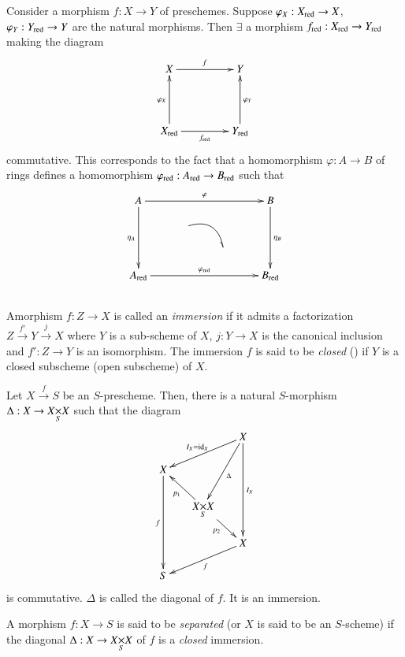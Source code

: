 Consider a morphism $f:X\to Y$ of preschemes. Suppose
$\varphi_{X}:X_{\operatorname{red}}\to X$, $\varphi_{Y}:Y_{\operatorname{red}}\to Y$ are the
natural morphisms. Then $\exists$ a morphism $f_{\operatorname{red}}:X_{\operatorname{red}}\to
Y_{\operatorname{red}}$ making the diagram
\[
\xymatrix@=1.5cm{
X\ar[r]^{f} & Y\\
X_{\red}\ar[u]^{\varphi_{X}}\ar[r]_{f_{\red}} & Y_{\red}\ar[u]_{\varphi_{Y}}
}
\]
commutative. This corresponds to the fact that a homomorphism
$\varphi:A\to B$ of rings defines a homomorphism
$\varphi_{\operatorname{red}}:A_{\operatorname{red}}\to B_{\operatorname{red}}$ such that
\[
\xymatrix@R=.5cm@C=1cm{
A\ar[rrr]^{\varphi}\ar[ddd]_{\eta_{A}} & & & B\ar[ddd]^{\eta_{B}}\\
 & \ar@/^1pc/@{-_{>}}[dr] & & \\
 & & & \\
A_{\red}\ar[rrr]^{\varphi_{\red}} & & & B_{\red}
}
\]


\subsection{}\label{chap2-sec2.4.2}%

A\pageoriginale morphism $f:Z\to X$ is called an {\em immersion} if it admits a factorization $Z\xrightarrow{f'}Y\xrightarrow{j}X$ where $Y$ is a sub-scheme of $X$, $j:Y\to X$ is the canonical inclusion and $f':Z\to Y$ is an isomorphism. The immersion $f$ is said to be {\em closed} () if $Y$ is a closed subscheme (\resp open subscheme) of $X$.

\begin{example*}
Let $X\xrightarrow{f}S$ be an $S$-prescheme. Then, there is a natural $S$-morphism $\Delta:X\to \fprod{X}{X}{S}$ such that the diagram
\[
\xymatrix@=.6cm{
 & & X\ar[dll]_{I_{X}=\id_{X}}\ar[ddd]^{I_{X}}\ar[ddl]^{\Delta}\\
X\ar[ddd]_{f} & & \\
 & \fprod{X}{X}{S}\ar[ul]^{p_{1}}\ar[dr]_{p_{2}} & \\
 & & X\ar[lld]^{f}\\
S & &
}
\]
is commutative. $\Delta$ is called the diagonal of $f$. It is an immersion.
\end{example*}

\setcounter{subsubsection}{2}
\begin{subdefin}\label{chap2-defi2.4.2.1}%
A morphism $f:X\to S$ is said to be {\em separated} (or $X$ is said to be an $S$-scheme) if the diagonal $\Delta:X\to \fprod{X}{X}{S}$ of $f$ is a {\em closed} immersion.
\end{subdefin}

